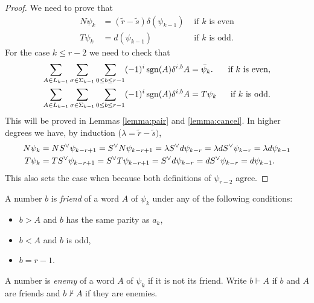 \begin{proof}
We need to prove that
\begin{align*}
	N\psi_{k} & = (\tilde{r}-\tilde{s})\delta(\psi_{k-1}) & \text{ if $k$ is even} \\
	T\psi_{k} &= d(\psi_{k-1}) & \text{ if $k$ is odd.}
\end{align*}
For the case $k\leq r-2$ we need to check that
\begin{align*}
	\sum_{A\in L_{k-1}}\sum_{\sigma\in \Sigma_{k-1}}\sum_{0\leq b\leq r-1}(-1)^i\operatorname*{sgn}(A)\delta^{i,b}A &= \bar{\psi}_k. & \text{ if $k$ is even,}\\
	\sum_{A\in L_{k-1}}\sum_{\sigma\in \Sigma_{k-1}}\sum_{0\leq b\leq r-1}(-1)^i\operatorname*{sgn}(A)\delta^{i,b}A &= T\psi_k & \text{if $k$ is odd.}
\end{align*}
This will be proved in Lemmas \ref{lemma:pair} and \ref{lemma:cancel}. In higher degrees we have, by induction  ($\lambda = \tilde{r}-\tilde{s})$,
\begin{align*}
	N\psi_{k} &= N{S}^{\vee}\psi_{k-r+1} = {S}^{\vee} N\psi_{k-r+1} = \lambda{S}^{\vee} d\psi_{k-r} = \lambda d{S}^{\vee} \psi_{k-r} = \lambda d\psi_{k-1}\\
	T\psi_{k} &= T{S}^{\vee}\psi_{k-r+1} = {S}^{\vee} T\psi_{k-r+1} = {S}^{\vee} d\psi_{k-r} = d{S}^{\vee} \psi_{k-r} = d\psi_{k-1}.
\end{align*}
This also sets the case when because both definitions of $\psi_{r-2}$ agree.
\end{proof}






A number $b$ is \emph{friend} of a word $A$ of $\psi_k$ under any of the following conditions:
\begin{itemize}
\item $b>A$ and $b$ has the same parity as $a_{k}$,
\item $b<A$ and $b$ is odd,
\item $b=r-1$.
\end{itemize}
A number is \emph{enemy} of a word $A$ of $\psi_k$ if it is not its friend. Write $b\vdash A$ if $b$ and $A$ are friends and $b\not\vdash A$ if they are enemies.

